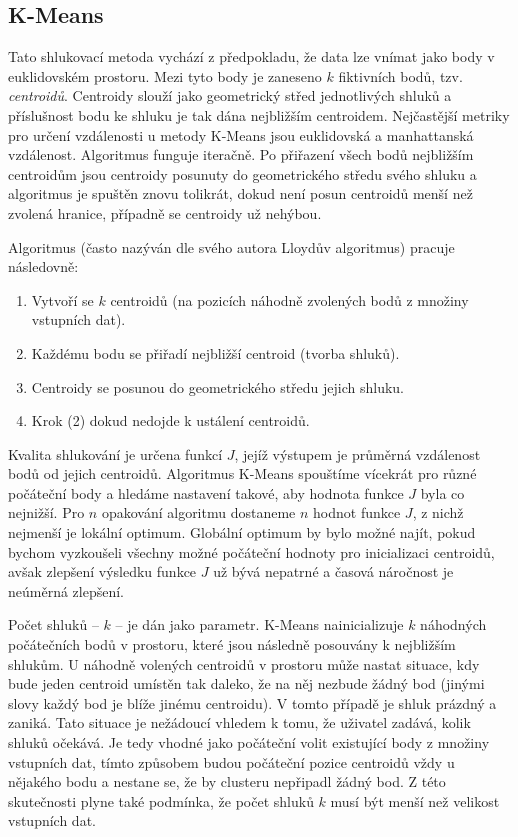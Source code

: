 \documentclass[pdftex,a4paper]{article}
\begin{document}
\subsection{K-Means}
Tato shlukovací metoda vychází z předpokladu, že data lze vnímat jako body v euklidovském prostoru. Mezi tyto body je zaneseno $k$ fiktivních bodů, tzv. \textit{centroidů}. Centroidy slouží jako geometrický střed jednotlivých shluků a příslušnost bodu ke shluku je tak dána nejbližším centroidem. Nejčastější metriky pro určení vzdálenosti u metody K-Means jsou euklidovská a manhattanská vzdálenost. Algoritmus funguje iteračně. Po přiřazení všech bodů nejbližším centroidům jsou centroidy posunuty do geometrického středu svého shluku a algoritmus je spuštěn znovu tolikrát, dokud není posun centroidů menší než zvolená hranice, případně se centroidy už nehýbou. 

Algoritmus (často nazýván dle svého autora Lloydův algoritmus) pracuje následovně:

\begin{enumerate}
	\item Vytvoří se $k$ centroidů (na pozicích náhodně zvolených bodů z množiny vstupních dat).
	\item Každému bodu se přiřadí nejbližší centroid (tvorba shluků).
	\item Centroidy se posunou do geometrického středu jejich shluku.
	\item Krok (2) dokud nedojde k ustálení centroidů.
\end{enumerate}

Kvalita shlukování je určena funkcí $J$, jejíž výstupem je průměrná vzdálenost bodů od jejich centroidů. Algoritmus K-Means spouštíme vícekrát pro různé počáteční body a hledáme nastavení takové, aby hodnota funkce $J$ byla co nejnižší. Pro $n$ opakování algoritmu dostaneme $n$ hodnot funkce $J$, z nichž nejmenší je lokální optimum. Globální optimum by bylo možné najít, pokud bychom vyzkoušeli všechny možné počáteční hodnoty pro inicializaci centroidů, avšak zlepšení výsledku funkce $J$ už bývá nepatrné a časová náročnost je neúměrná zlepšení.

Počet shluků -- $k$ -- je dán jako parametr. K-Means nainicializuje $k$ náhodných počátečních bodů v prostoru, které jsou následně posouvány k nejbližším shlukům. U náhodně volených centroidů v prostoru může nastat situace, kdy bude jeden centroid umístěn tak daleko, že na něj nezbude žádný bod (jinými slovy každý bod je blíže jinému centroidu). V tomto případě je shluk prázdný a zaniká. Tato situace je nežádoucí vhledem k tomu, že uživatel zadává, kolik shluků očekává. Je tedy vhodné jako počáteční volit existující body z množiny vstupních dat, tímto způsobem budou počáteční pozice centroidů vždy u nějakého bodu a nestane se, že by clusteru nepřipadl žádný bod. Z této skutečnosti plyne také podmínka, že počet shluků $k$ musí být menší než velikost vstupních dat.
\end{document}

